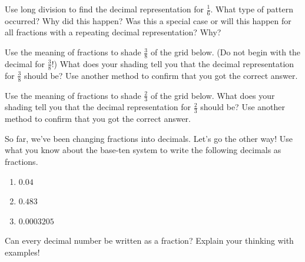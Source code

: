 \documentclass[noauthor, nooutcomes]{ximera}
\begin{document}
\begin{problem}
Use long division to find the decimal representation for $\frac{1}{6}$. What type of pattern occurred?  Why did this happen?  Was this a special case or will this happen for all fractions with a repeating decimal representation?  Why?
\end{problem}


\begin{problem}
Use the meaning of fractions to shade $\frac{3}{8}$ of the grid below. (Do not begin with the decimal for $\frac{3}{8}$!) What does your shading tell you that the decimal representation for $\frac{3}{8}$ should be? Use another method to confirm that you got the correct answer.
\begin{center}
\end{center}
\end{problem}


\begin{problem}
Use the meaning of fractions to shade $\frac{2}{3}$ of the grid below. What does your shading tell you that the decimal representation for $\frac{2}{3}$ should be? Use another method to confirm that you got the correct answer.
\begin{center}
\end{center}
\end{problem}



\begin{problem}
So far, we've been changing fractions into decimals. Let's go the other way! Use what you know about the base-ten system to write the following decimals as fractions.
\begin{enumerate}
    \item $0.04$
    \item $0.483$
    \item $0.0003205$
\end{enumerate}
\end{problem}


\begin{problem}
Can every decimal number be written as a fraction? Explain your thinking with examples!
\end{problem}
\end{document}
